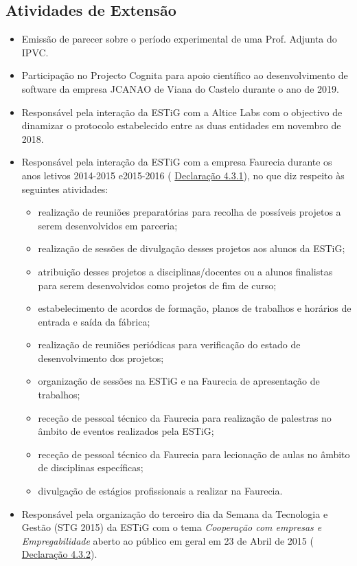 \documentclass[11pt]{article}
\begin{document}
\subsection{Atividades de Extensão}
\begin{itemize}
\item{Emissão de parecer sobre o período experimental de uma Prof. Adjunta do IPVC.}
\item{Participação no Projecto Cognita para apoio científico ao desenvolvimento de software da empresa JCANAO de Viana do Castelo durante o ano de 2019.}
\item{Responsável pela interação da ESTiG com a Altice Labs com o objectivo de dinamizar o protocolo estabelecido entre as duas entidades em novembro de 2018.}
\item{Responsável pela interação da ESTiG com a empresa Faurecia durante os anos letivos 2014-2015 e2015-2016 (
\href{run:MissaoIPBoutros/FAURECIA.pdf}{Declaração 4.3.1}), no que diz respeito às seguintes atividades:}
\begin{itemize}
\item{realização de reuniões preparatórias para recolha de possíveis projetos a serem desenvolvidos em parceria;}
\item{realização de sessões de divulgação desses projetos aos alunos da ESTiG;}
\item{atribuição desses projetos a disciplinas/docentes ou a alunos finalistas para serem desenvolvidos como projetos de fim de curso;}
\item{estabelecimento de acordos de formação, planos de trabalhos e horários de entrada e saída da fábrica;}
\item{realização de reuniões periódicas para verificação do estado de desenvolvimento dos projetos;}
\item{organização de sessões na ESTiG e na Faurecia de apresentação de trabalhos;}
\item{receção de pessoal técnico da Faurecia para realização de palestras no âmbito de eventos realizados pela ESTiG;}
\item{receção de pessoal técnico da Faurecia para lecionação de aulas no âmbito de disciplinas específicas;}
\item{divulgação de estágios profissionais a realizar na Faurecia.}
\end{itemize}
\item{Responsável pela organização do terceiro dia da Semana da Tecnologia e Gestão (STG 2015) da ESTiG com o tema {
\em{ Cooperação com empresas e Empregabilidade}} aberto ao público em geral em 23 de Abril de 2015 (
\href{run:MissaoIPBoutros/STG2015.pdf}{Declaração 4.3.2}).}
\end{itemize}
\end{document}
